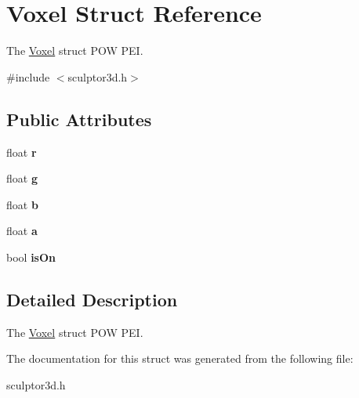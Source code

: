 \hypertarget{struct_voxel}{}\section{Voxel Struct Reference}
\label{struct_voxel}


The \hyperlink{struct_voxel}{Voxel} struct P\+OW P\+EI.  




{\ttfamily \#include $<$sculptor3d.\+h$>$}

\subsection*{Public Attributes}
\begin{DoxyCompactItemize}
\item 
\mbox{\label{struct_voxel_a06872ec79b836120b551a848968c0f1b}} 
float {\bfseries r}
\item 
\mbox{\label{struct_voxel_a27c0da1ed2ff430401d23ff171612a73}} 
float {\bfseries g}
\item 
\mbox{\label{struct_voxel_a5cd8432b1d7d0fd8b79e0fc7d10373a8}} 
float {\bfseries b}
\item 
\mbox{\label{struct_voxel_a3ce2579eb0a9f09a07112ce7498a638e}} 
float {\bfseries a}
\item 
\mbox{\label{struct_voxel_a6fbe8bd53f64685ac4210726d40fc775}} 
bool {\bfseries is\+On}
\end{DoxyCompactItemize}


\subsection{Detailed Description}
The \hyperlink{struct_voxel}{Voxel} struct P\+OW P\+EI. 

The documentation for this struct was generated from the following file\+:\begin{DoxyCompactItemize}
\item 
sculptor3d.\+h\end{DoxyCompactItemize}
